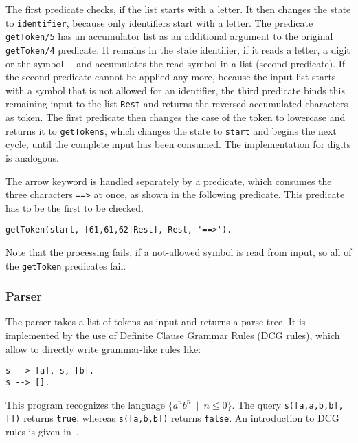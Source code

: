 The first predicate checks, if the list starts with a letter. It then changes the state to \lstinline|identifier|, because only identifiers start with a letter. The predicate \lstinline|getToken/5| has an accumulator list as an additional argument to the original \lstinline|getToken/4| predicate. It remains in the state identifier, if it reads a letter, a digit or the symbol~\lstinline|-| and accumulates the read symbol in a list (second predicate). If the second predicate cannot be applied any more, because the input list starts with a symbol that is not allowed for an identifier, the third predicate binds this remaining input to the list \lstinline|Rest| and returns the reversed accumulated characters as token. The first predicate then changes the case of the token to lowercase and returns it to \lstinline|getTokens|, which changes the state to \lstinline|start| and begins the next cycle, until the complete input has been consumed. The implementation for digits is analogous.

The arrow keyword is handled separately by a predicate, which consumes the three characters \lstinline|==>| at once, as shown in the following predicate. This predicate has to be the first to be checked.

\begin{lstlisting}
getToken(start, [61,61,62|Rest], Rest, '==>').
\end{lstlisting}

Note that the processing fails, if a not-allowed symbol is read from input, so all of the \lstinline|getToken| predicates fail.

\subsubsection{Parser}

The parser takes a list of tokens as input and returns a parse tree. It is implemented by the use of Definite Clause Grammar Rules (DCG rules), which allow to directly write grammar-like rules like:

\begin{lstlisting}
s --> [a], s, [b].
s --> [].
\end{lstlisting}

This program recognizes the language $\{ a^nb^n \enspace | \enspace n \leq 0 \}$. The query \lstinline|s([a,a,b,b],[])| returns \lstinline|true|, whereas \lstinline|s([a,b,b])| returns \lstinline|false|. An introduction to DCG rules is given in~\cite{ogb_dcg}.

